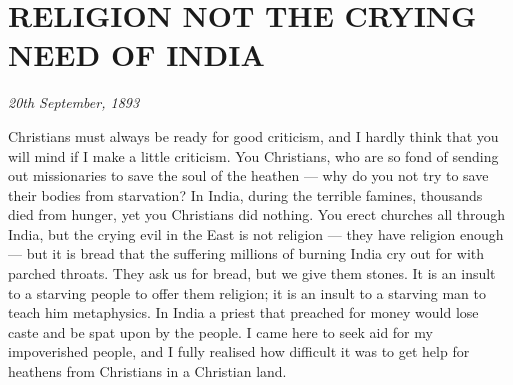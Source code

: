 \section{RELIGION NOT THE CRYING NEED OF INDIA}
\begin{center}\textit{ \textit{20th September, 1893}}\end{center}

Christians must always be ready for good criticism, and I
hardly think that you will mind if I make a little criticism. You
Christians, who are so fond of sending out missionaries to save the
soul of the heathen — why do you not try to save their bodies from
starvation? In India, during the terrible famines, thousands died from
hunger, yet you Christians did nothing. You erect churches all through
India, but the crying evil in the East is not religion — they have
religion enough — but it is bread that the suffering millions of
burning India cry out for with parched throats. They ask us for bread,
but we give them stones. It is an insult to a starving people to offer
them religion; it is an insult to a starving man to teach him
metaphysics. In India a priest that preached for money would lose caste
and be spat upon by the people. I came here to seek aid for my
impoverished people, and I fully realised how difficult it was to get
help for heathens from Christians in a Christian land.\\

